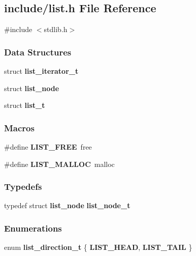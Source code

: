 \subsection{include/list.h File Reference}
\label{list_8h}
{\ttfamily \#include $<$stdlib.\+h$>$}\newline
\subsubsection*{Data Structures}
\begin{DoxyCompactItemize}
\item 
struct \textbf{ list\+\_\+iterator\+\_\+t}
\item 
struct \textbf{ list\+\_\+node}
\item 
struct \textbf{ list\+\_\+t}
\end{DoxyCompactItemize}
\subsubsection*{Macros}
\begin{DoxyCompactItemize}
\item 
\#define \textbf{ L\+I\+S\+T\+\_\+\+F\+R\+EE}~free
\item 
\#define \textbf{ L\+I\+S\+T\+\_\+\+M\+A\+L\+L\+OC}~malloc
\end{DoxyCompactItemize}
\subsubsection*{Typedefs}
\begin{DoxyCompactItemize}
\item 
typedef struct \textbf{ list\+\_\+node} \textbf{ list\+\_\+node\+\_\+t}
\end{DoxyCompactItemize}
\subsubsection*{Enumerations}
\begin{DoxyCompactItemize}
\item 
enum \textbf{ list\+\_\+direction\+\_\+t} \{ \textbf{ L\+I\+S\+T\+\_\+\+H\+E\+AD}, 
\textbf{ L\+I\+S\+T\+\_\+\+T\+A\+IL}
 \}
\end{DoxyCompactItemize}
